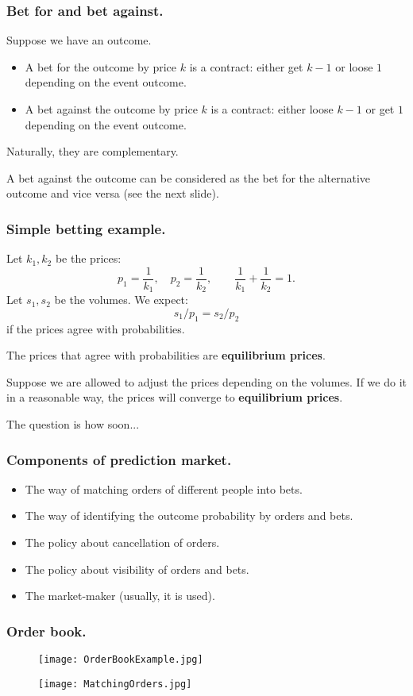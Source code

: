 \documentclass{beamer}
\begin{document}
\begin{frame}[fragile]
\frametitle{Bet for and bet against.}
Suppose we have an outcome.

\begin{itemize}
	\item A bet for the outcome by price $k$ is a contract: either get $k-1$ or loose $1$ depending on the event outcome.
  \item A bet against the outcome by price $k$ is a contract: either loose $k-1$ or get $1$ depending on the event outcome.
\end{itemize}
Naturally, they are complementary.

A bet against the outcome can be considered as the bet for the alternative outcome and vice versa (see the next slide).
\end{frame}
\begin{frame}[fragile]
\frametitle{Simple betting example.}

Let $k_1, k_2$ be the prices:
$$p_1=\frac{1}{k_1},\quad p_2=\frac{1}{k_2}, \qquad\frac{1}{k_1} + \frac{1}{k_2} = 1.$$
Let $s_1, s_2$ be the volumes. We expect:
$$s_1/p_1 = s_2/p_2$$
if the prices agree with probabilities.

The prices that agree with probabilities are \textbf{equilibrium prices}.

Suppose we are allowed to adjust the prices depending on the volumes.
If we do it in a reasonable way, the prices will converge to \textbf{equilibrium prices}.

The question is how soon...
\end{frame}
\begin{frame}[fragile]
\frametitle{Components of prediction market.}
\begin{itemize}
	\item The way of matching orders of different people into bets.
	\item The way of identifying the outcome probability by orders and bets.
	\item The policy about cancellation of orders.
	\item The policy about visibility of orders and bets.
	\item The market-maker (usually, it is used).
\end{itemize}
\end{frame}
\begin{frame}[fragile]
\frametitle{Order book.}
\begin{figure}
\centering
\texttt{[image: OrderBookExample.jpg]}
\end{figure}
\begin{figure}
\centering
\texttt{[image: MatchingOrders.jpg]}
\end{figure}
\end{frame}
\end{document}
